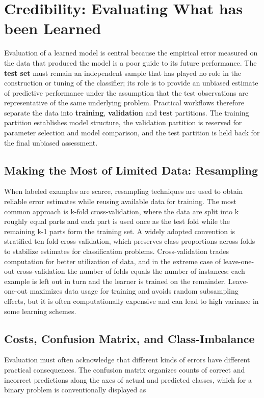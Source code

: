 \section{Credibility: Evaluating What has been Learned}
Evaluation of a learned model is central because the empirical error measured on the data that produced the model is a poor guide to its future performance. The \textbf{test set} must remain an independent sample that has played no role in the construction or tuning of the classifier; its role is to provide an unbiased estimate of predictive performance under the assumption that the test observations are representative of the same underlying problem. Practical workflows therefore separate the data into \textbf{training}, \textbf{validation} and \textbf{test} partitions. The training partition establishes model structure, the validation partition is reserved for parameter selection and model comparison, and the test partition is held back for the final unbiased assessment.

\subsection{Making the Most of Limited Data: Resampling}

When labeled examples are scarce, resampling techniques are used to obtain reliable error estimates while reusing available data for training. The most common approach is k-fold cross-validation, where the data are split into k roughly equal parts and each part is used once as the test fold while the remaining k-1 parts form the training set. A widely adopted convention is stratified ten-fold cross-validation, which preserves class proportions across folds to stabilize estimates for classification problems. Cross-validation trades computation for better utilization of data, and in the extreme case of leave-one-out cross-validation the number of folds equals the number of instances: each example is left out in turn and the learner is trained on the remainder. Leave-one-out maximizes data usage for training and avoids random subsampling effects, but it is often computationally expensive and can lead to high variance in some learning schemes.

\subsection{Costs, Confusion Matrix, and Class-Imbalance}

Evaluation must often acknowledge that different kinds of errors have different practical consequences. The confusion matrix organizes counts of correct and incorrect predictions along the axes of actual and predicted classes, which for a binary problem is conventionally displayed as

